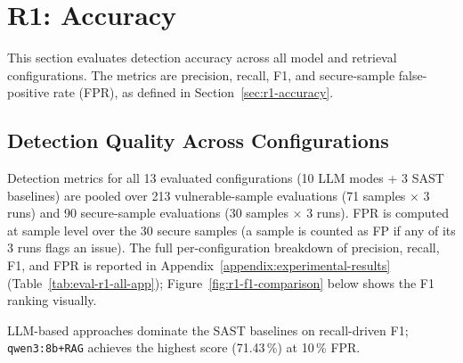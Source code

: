 \section{R1: Accuracy}
\label{sec:eval-r1}

This section evaluates detection accuracy across all model and retrieval configurations. The metrics are precision, recall, F1, and secure-sample false-positive rate (FPR), as defined in Section~\ref{sec:r1-accuracy}.

\subsection{Detection Quality Across Configurations}

Detection metrics for all 13 evaluated configurations (10 LLM modes + 3 SAST baselines) are pooled over 213 vulnerable-sample evaluations (71 samples $\times$ 3 runs) and 90 secure-sample evaluations (30 samples $\times$ 3 runs). FPR is computed at sample level over the 30 secure samples (a sample is counted as FP if any of its 3 runs flags an issue). The full per-configuration breakdown of precision, recall, F1, and FPR is reported in Appendix~\ref{appendix:experimental-results} (Table~\ref{tab:eval-r1-all-app}); Figure~\ref{fig:r1-f1-comparison} below shows the F1 ranking visually.

LLM-based approaches dominate the SAST baselines on recall-driven F1; \texttt{qwen3:8b+RAG} achieves the highest score (71.43\,\%) at 10\,\% FPR.

